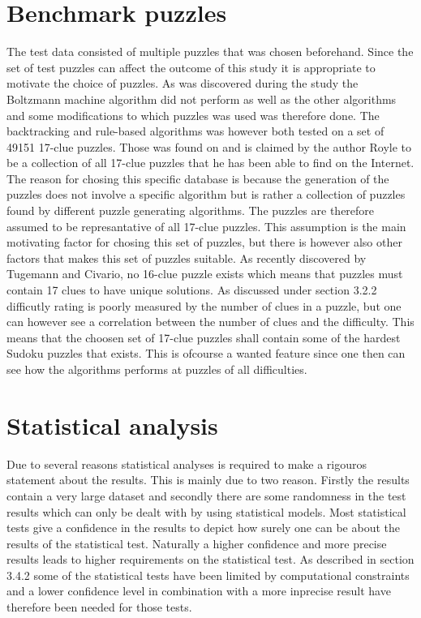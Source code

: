 \documentclass[a4paper,11pt]{kth-mag}
\begin{document}
\section{Benchmark puzzles}
The test data consisted of multiple puzzles that was chosen beforehand.
Since the set of test puzzles can affect the outcome of this study it is appropriate to motivate the choice of puzzles.
As was discovered during the study the Boltzmann machine algorithm did not perform as well as the other algorithms and some modifications to which puzzles was used was therefore done.
The backtracking and rule-based algorithms was however both tested on a set of 49151 17-clue puzzles. 
Those was found on \cite{database} and is claimed by the author Royle to be a collection of all 17-clue puzzles that he has been able to find on the Internet. 
The reason for chosing this specific database is because the generation of the puzzles does not involve a specific algorithm but is rather a collection of puzzles found by different puzzle generating algorithms.  
The puzzles are therefore assumed to be represantative of all 17-clue puzzles. 
This assumption is the main motivating factor for chosing this set of puzzles, but there is however also other factors that makes this set of puzzles suitable. 
As recently discovered by Tugemann and Civario, no 16-clue puzzle exists which means that puzzles must contain 17 clues to have unique solutions. \cite{17clueProof}  
As discussed under section 3.2.2 difficutly rating is poorly measured by the number of clues in a puzzle, but one can however see a correlation between the number of clues and the difficulty. \cite{difficulty}
This means that the choosen set of 17-clue puzzles shall contain some of the hardest Sudoku puzzles that exists.
This is ofcourse a wanted feature since one then can see how the algorithms performs at puzzles of all difficulties.

\FloatBarrier
\section{Statistical analysis}
Due to several reasons statistical analyses is required to make a rigouros statement about the results. 
This is mainly due to two reason.
Firstly the results contain a very large dataset and secondly there are some randomness in the test results which can only be dealt with by using statistical models. 
Most statistical tests give a confidence in the results to depict how surely one can be about the results of the statistical test. Naturally a higher confidence and more precise results leads to higher requirements on the statistical test. As described in section 3.4.2 some of the statistical tests have been limited by computational constraints and a lower confidence level in combination with a more inprecise result have therefore been needed for those tests.
\FloatBarrier
\end{document}
